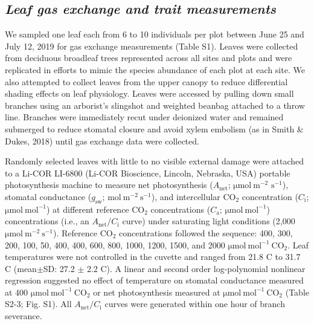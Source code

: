 \subsection{\textit{Leaf gas exchange and trait measurements}}
We sampled one leaf each from 6 to 10 individuals per plot between June 25 and July 12, 2019 for gas exchange measurements (Table S1). Leaves were collected from deciduous broadleaf trees represented across all sites and plots and were replicated in efforts to mimic the species abundance of each plot at each site. We also attempted to collect leaves from the upper canopy to reduce differential shading effects on leaf physiology. Leaves were accessed by pulling down small branches using an arborist’s slingshot and weighted beanbag attached to a throw line. Branches were immediately recut under deionized water and remained submerged to reduce stomatal closure and avoid xylem embolism (as in Smith \& Dukes, 2018) until gas exchange data were collected.

Randomly selected leaves with little to no visible external damage were attached to a Li-COR LI-6800 (Li-COR Bioscience, Lincoln, Nebraska, USA) portable photosynthesis machine to measure net photosynthesis ($A_\mathrm{{net}}$; $\mathrm{\mu mol\ m^{-2}}$ $\mathrm{{s}^{-1}}$), stomatal conductance ($g_\mathrm{{sw}}$; $\mathrm{mol\ m^{-2}\ s^{-1}}$), and intercellular $\mathrm{CO_2}$ concentration ($C_\mathrm{i}$; $\mathrm{\mu mol\ mol^{-1}}$) at different reference $\mathrm{CO_2}$ concentrations ($C_\mathrm{a}$; $\mathrm{\mu mol\ mol^{-1}}$) concentrations (i.e., an $A_\mathrm{{net}}/C_\mathrm{i}$ curve) under saturating light conditions (2,000 $\mathrm{\mu mol\ m^{-2}\ s^{-1}}$). Reference $\mathrm{CO_2}$ concentrations followed the sequence: 400, 300, 200, 100, 50, 400, 400, 600, 800, 1000, 1200, 1500, and 2000 $\mathrm{\mu mol\ mol^{-1}\ CO_2}$. Leaf temperatures were not controlled in the cuvette and ranged from 21.8 \textdegree{}C to 31.7 \textdegree{}C (mean$\pm$SD: 27.2 $\pm$ 2.2 \textdegree{}C). A linear and second order log-polynomial nonlinear regression suggested no effect of temperature on stomatal conductance measured at 400 $\mathrm{\mu mol\ mol^{-1}\ CO_2}$ or net photosynthesis measured at $\mathrm{\mu mol\ mol^{-1}\ CO_2}$ (Table S2-3; Fig. S1). All $A_\mathrm{{net}}/C_\mathrm{i}$ curves were generated within one hour of branch severance.

